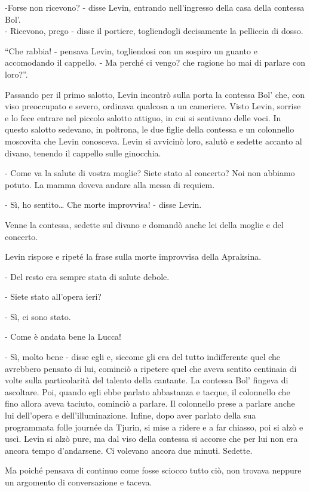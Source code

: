 -Forse non ricevono? - disse Levin, entrando nell'ingresso della casa della contessa Bol'. \\
- Ricevono, prego - disse il portiere, togliendogli decisamente la pelliccia di dosso. 

``Che rabbia! - pensava Levin, togliendosi con un sospiro un guanto e accomodando il cappello. - Ma perché ci vengo? che ragione ho mai di parlare con loro?''. 

Passando per il primo salotto, Levin incontrò sulla porta la contessa Bol' che, con viso preoccupato e severo, ordinava qualcosa a un cameriere. Visto Levin, sorrise e lo fece entrare nel piccolo salotto attiguo, in cui si sentivano delle voci. In questo salotto sedevano, in poltrona, le due figlie della contessa e un colonnello moscovita che Levin conosceva. Levin si avvicinò loro, salutò e sedette accanto al divano, tenendo il cappello sulle ginocchia. 

- Come va la salute di vostra moglie? Siete stato al concerto? Noi non abbiamo potuto. La mamma doveva andare alla messa di requiem. 

- Sì, ho sentito\ldots{} Che morte improvvisa! - disse Levin. 

Venne la contessa, sedette sul divano e domandò anche lei della moglie e del concerto. 

Levin rispose e ripeté la frase sulla morte improvvisa della Apraksina. 

- Del resto era sempre stata di salute debole. 

- Siete stato all'opera ieri? 

- Sì, ci sono stato. 

- Come è andata bene la Lucca! 

- Sì, molto bene - disse egli e, siccome gli era del tutto indifferente quel che avrebbero pensato di lui, cominciò a ripetere quel che aveva sentito centinaia di volte sulla particolarità del talento della cantante. La contessa Bol' fingeva di ascoltare. Poi, quando egli ebbe parlato abbastanza e tacque, il colonnello che fino allora aveva taciuto, cominciò a parlare. Il colonnello prese a parlare anche lui dell'opera e dell'illuminazione. Infine, dopo aver parlato della sua programmata folle journée da Tjurin, si mise a ridere e a far chiasso, poi si alzò e uscì. Levin si alzò pure, ma dal viso della contessa si accorse che per lui non era ancora tempo d'andarsene. Ci volevano ancora due minuti. Sedette. 

Ma poiché pensava di continuo come fosse sciocco tutto ciò, non trovava neppure un argomento di conversazione e taceva. 

